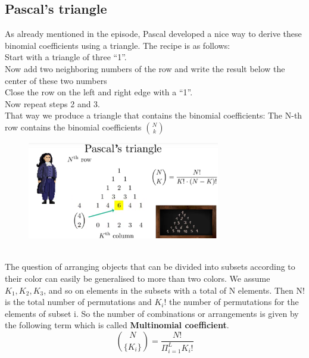 \documentclass[12pt, a4paper]{scrartcl}
\begin{document}
\subsection*{Pascal’s triangle }
As already mentioned in the episode, Pascal developed a nice way to derive these binomial coefficients using a triangle.
The recipe is as follows:\\
      Start with a  triangle of three ``1''.\\
      Now add two neighboring numbers of the row and write the result below the center of these two numbers\\
      Close the row on the left and right edge with a ``1''.\\
Now repeat steps 2 and 3.\\
That way we produce a triangle that contains the binomial coefficients: The N-th row contains the binomial coefficients ${N \choose k} $\\
 \begin{figure}[H]
	\centering
	\includegraphics[width=0.75\textwidth]{4_3.png}
\end{figure}
\\

The question of arranging objects that can be divided into subsets according to their color can easily be generalised to more than two colors. We assume $K_1, K_2, K_3$, and so on elements in the subsets with a total of N elements.
Then N! is the total number of permutations and $K_i!$ the number of permutations for the elements of subset i.
So the number of combinations or arrangements is given by the following term which is called \textbf{Multinomial coefficient}.\\
\begin{equation*}\boxed{{N\choose \{K_i\}}=\frac{N!}{\Pi_{i=1}^LK_i!}
}\end{equation*}\\
\end{document}
